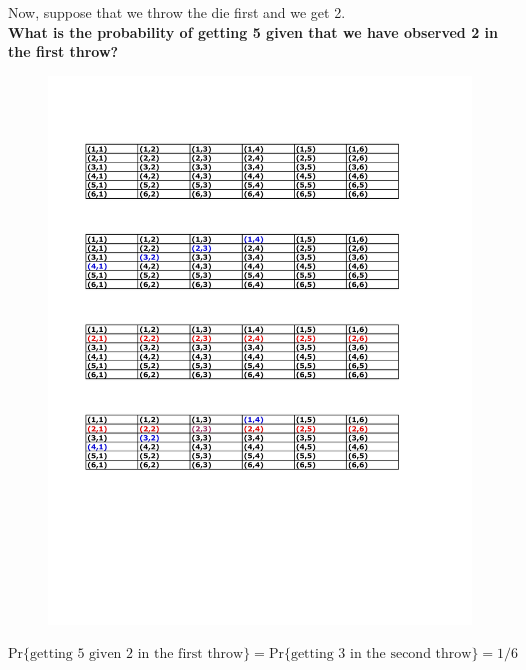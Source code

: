 \documentclass[notes=show, handout]{beamer}\usepackage[]{graphicx}\usepackage[]{color}
\begin{document}
\begin{frame}{\secname}
  \begin{example}[cont'd]
  Now, suppose that we throw the die first and we get 2.\\
  \vspace{0.2cm}
  \textbf{What is the probability of getting 5 given that we have observed 2 in the first throw?}
  \begin{figure}[h!]
  \centering
  \includegraphics[scale=0.7]{img/c4.pdf}
  \end{figure}
  \begin{footnotesize}
  $\text{Pr}\{\text{getting 5 given 2 in the first throw}\}= \text{Pr}\{\text{getting 3 in the second throw}\}=1/6$
  \end{footnotesize}
  \end{example}
\end{frame}
\end{document}
